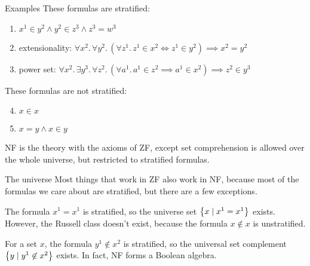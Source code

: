 \documentclass[xcolor=dvipsnames]{beamer}
\begin{document}
\begin{frame}{Examples}
    These formulas are stratified:
    \begin{enumerate}
        \item \( x^1 \in y^2 \wedge y^2 \in z^3 \wedge z^3 = w^3 \)
        \item extensionality: \( \forall x^2.\, \forall y^2.\, (\forall z^1.\, z^1 \in x^2 \iff z^1 \in y^2) \implies x^2 = y^2 \)
        \item power set: \( \forall x^2.\, \exists y^3.\, \forall z^2.\, (\forall a^1.\, a^1 \in z^2 \implies a^1 \in x^2) \implies z^2 \in y^3 \)
    \end{enumerate}
    These formulas are not stratified:
    \begin{enumerate}
        \setcounter{enumi}{3}
        \item \( x \in x \)
        \item \( x = y \wedge x \in y \)
    \end{enumerate}
    NF is the theory with the axioms of ZF, except set comprehension is allowed over the whole universe, but restricted to stratified formulas.
\end{frame}


\begin{frame}{The universe}
    Most things that work in ZF also work in NF, because most of the formulas we care about are stratified, but there are a few exceptions.

    \medskip

    The formula \( x^1 = x^1 \) is stratified, so the universe set \( \qty{x\mid x^1 = x^1} \) exists. However, the Russell class doesn't exist, because the formula \( x \not\in x \) is unstratified.

    \medskip

    For a set \( x \), the formula \( y^1 \not\in x^2 \) is stratified, so the universal set complement \( \qty{y\mid y^1 \not\in x^2} \) exists. In fact, NF forms a Boolean algebra.
\end{frame}
\iffalse
\begin{frame}{Cardinals}
    Cardinals in ZF are equivalence classes of equinumerous sets.
    \[ 1 \text{ is the class of sets } x \text{ where } x \simeq \qty{\varnothing} \]
    In NF, cardinals can be represented as the set of all sets of a given size.
    \[ 1 = \qty{x\mid \exists y^1.\, y^1 \in x^2 \wedge \forall z^1 \in x^2.\, z^1 = y^1} \]
\end{frame}
\begin{frame}{Choice}
    NF disproves the axiom of choice.

    \medskip

    However, a weakened form of the axiom of choice (for example, one that only operates on well-founded sets) may still work well with NF.
\end{frame}
\fi
\end{document}
